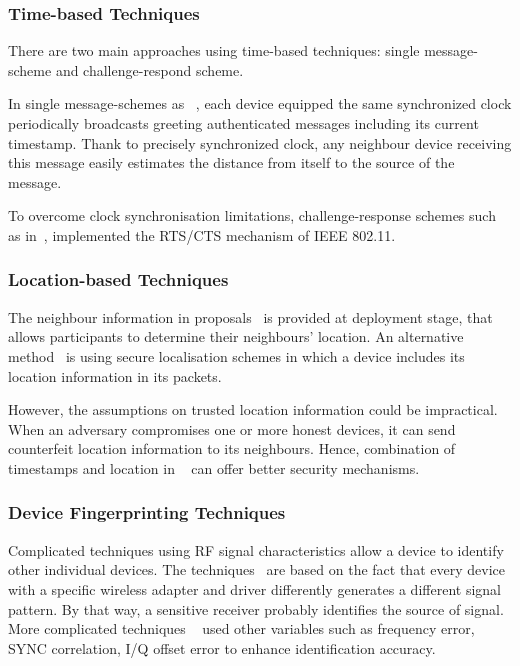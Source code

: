 \subsubsection*{Time-based Techniques}

There are two main approaches using time-based techniques: single message-scheme and challenge-respond scheme. 

In single message-schemes as ~\cite{Brands:1994aa,Hancke:2005:RDB:1128018.1128472,Capkun:2003:SST:986858.986862,Yih-ChunHu2002}, each device equipped the same synchronized clock periodically broadcasts greeting authenticated messages including its current timestamp. Thank to precisely synchronized clock, any neighbour device receiving this message easily estimates the distance from itself to the source of the message. 

To overcome clock synchronisation limitations, challenge-response schemes such as in~\cite{4110280},\cite{FaridNait-Abdesselam2008} implemented the RTS/CTS mechanism of IEEE 802.11. 

\subsubsection*{Location-based Techniques}

The neighbour information in proposals~\cite{Yih-ChunHu2002,LOUKASLAZOS,LoukasLazos2005, 4146955} is provided at deployment stage, that allows participants to determine their neighbours' location. An alternative method~\cite{1589106} is using secure localisation schemes in which a device includes its location information in its packets. 

However, the assumptions on trusted location information could be impractical. When an adversary compromises one or more honest devices, it can send counterfeit location information to its neighbours. Hence, combination of timestamps and location in ~\cite{Shokri:2009:PSN:1514274.1514302} can offer better security mechanisms.

\subsubsection*{Device Fingerprinting Techniques}

Complicated techniques using RF signal characteristics allow a device to identify other individual devices. The techniques~ \cite{Kasper, OktayUreten2007, VladimirBrik} are based on the fact that every device with a specific wireless adapter and driver differently generates a different signal pattern. By that way, a sensitive receiver probably identifies the source of signal. More complicated techniques ~\cite{SumanJana, 5211943, 819017} used other variables such as frequency error, SYNC correlation, I/Q offset error to enhance identification accuracy. 

